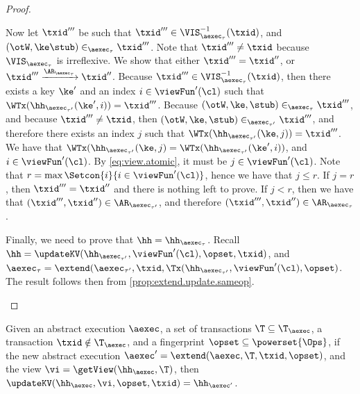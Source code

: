\begin{proof}
\begin{itemize}
\begin{itemize}
Now let $\txid'''$ be such that $\txid''' \in \VIS^{-1}_{\aexec_{\tau}}(\txid)$, and $(\otW, \ke \stub) \in_{\aexec_{\tau}} \txid'''$. 
Note that $\txid''' \neq \txid$ because $\VIS_{\aexec_{\tau}}$ is irreflexive.
We show that either $\txid''' = \txid''$, or $\txid''' \xrightarrow{\AR_{\aexec_{\tau}}} \txid''$. 
Because $\txid''' \in \VIS^{-1}_{\aexec_{\tau}}(\txid)$, then there exists a key $\ke'$ and an index $i \in \viewFun'(\cl)$ 
such that $\WTx(\hh_{\aexec_{\tau'}}(\ke', i)) = \txid'''$. Because $(\otW, \ke, \stub) \in_{\aexec_{\tau}} \txid'''$, 
and because $\txid''' \neq \txid$, then $(\otW, \ke, \stub) \in_{\aexec_{\tau'}} \txid'''$, and therefore there exists 
an index $j$ such that $\WTx(\hh_{\aexec_{\tau'}}(\ke, j)) = \txid'''$. We have that $\WTx(\hh_{\aexec_{\tau'}}(\ke, j) = 
\WTx(\hh_{\aexec_{\tau'}}(\ke', i))$, and $i \in \viewFun'(\cl)$. By \cref{eq:view.atomic}, it must be $j \in \viewFun'(\cl)$. 
Note that $r = \max\Setcon{i }{ i \in \viewFun'(\cl)}$, hence we have that $j \leq r$. If $j = r$, then $\txid''' = \txid''$ and 
there is nothing left to prove. If $j < r$, then we have that $(\txid''', \txid'') \in \AR_{\aexec_{\tau'}}$, and 
therefore $(\txid''', \txid'') \in \AR_{\aexec_{\tau}}$.
\end{itemize}
Finally, we need to prove that $\hh = \hh_{\aexec_{\tau}}$.
Recall $\hh = \updateKV(\hh_{\aexec_{\tau'}}, \viewFun'(\cl), \opset, \txid)$, 
and $\aexec_{\tau} = \extend(\aexec_{\tau'}, \txid, \Tx(\hh_{\aexec_{\tau'}}, \viewFun'(\cl), \opset)$. 
The result follows then from \cref{prop:extend.update.sameop}. 
\end{itemize}
\end{proof}


\begin{proposition}
\label{prop:extend.update.sameop}
Given an abstract execution $\aexec$, a set of transactions $\T \subseteq \T_{\aexec}$,
a transaction $\txid \notin \T_{\aexec}$, and a fingerprint $\opset \subseteq \powerset{\Ops}$,
if the new abstract execution $\aexec' = \extend(\aexec, \T, \txid, \opset)$,
and the view $\vi = \getView(\hh_{\aexec}, \T)$,
then $\updateKV(\hh_{\aexec}, \vi, \opset, \txid) = \hh_{\aexec'}$.
\end{proposition}

